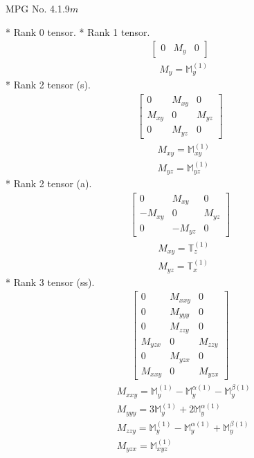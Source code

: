 \documentclass[fleqn,8pt,landscape]{jsarticle}
\begin{document}
\setcounter{MaxMatrixCols}{32}

\renewcommand{\tablename}{Table~}
\renewcommand{\figurename}{Figure~}
\begin{center}
\LARGE
MPG No. 4.1.9\quad$m$
\end{center}
* Rank 0 tensor.
* Rank 1 tensor.
\begin{align*}
\begin{bmatrix} 0 & M_{y} & 0 \end{bmatrix}
\end{align*}
\begin{align*}
& M_{y} = \mathbb{M}_{y}^{(1)}
\end{align*}
* Rank 2 tensor (s).
\begin{align*}
\begin{bmatrix} 0 & M_{xy} & 0 \\ M_{xy} & 0 & M_{yz} \\ 0 & M_{yz} & 0 \end{bmatrix}
\end{align*}
\begin{align*}
& M_{xy} = \mathbb{M}_{xy}^{(1)} \\
& M_{yz} = \mathbb{M}_{yz}^{(1)}
\end{align*}
* Rank 2 tensor (a).
\begin{align*}
\begin{bmatrix} 0 & M_{xy} & 0 \\ - M_{xy} & 0 & M_{yz} \\ 0 & - M_{yz} & 0 \end{bmatrix}
\end{align*}
\begin{align*}
& M_{xy} = \mathbb{T}_{z}^{(1)} \\
& M_{yz} = \mathbb{T}_{x}^{(1)}
\end{align*}
* Rank 3 tensor (ss).
\begin{align*}
\begin{bmatrix} 0 & M_{xxy} & 0 \\ 0 & M_{yyy} & 0 \\ 0 & M_{zzy} & 0 \\ M_{yzx} & 0 & M_{zzy} \\ 0 & M_{yzx} & 0 \\ M_{xxy} & 0 & M_{yzx} \end{bmatrix}
\end{align*}
\begin{align*}
& M_{xxy} = \mathbb{M}_{y}^{(1)} - \mathbb{M}_{y}^{\alpha(1)} - \mathbb{M}_{y}^{\beta(1)} \\
& M_{yyy} = 3 \mathbb{M}_{y}^{(1)} + 2 \mathbb{M}_{y}^{\alpha(1)} \\
& M_{zzy} = \mathbb{M}_{y}^{(1)} - \mathbb{M}_{y}^{\alpha(1)} + \mathbb{M}_{y}^{\beta(1)} \\
& M_{yzx} = \mathbb{M}_{xyz}^{(1)}
\end{align*}
\end{document}
